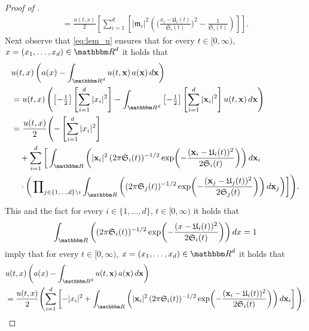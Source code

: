 \begin{proof}[Proof of ]
\begin{equation}
\begin{split}
			= \frac{u(t,x)}{2} \left[ \sum_{i=1}^d \left[ |\mathfrak{m}_i|^2 \left( \bigg(\frac{x_i - \mathfrak{U}_i(t)}{\mathfrak{S}_i(t)}\bigg)^{\!2} - \frac{1}{\mathfrak{S}_i(t)} \right)\right]\right].
		\end{split}
	\end{equation}
	Next observe that \eqref{eq:lem_u} ensures that for every
	$t \in [0,\infty)$,
	$x = (x_1, \dots,x_d)\in \R^d$
	it holds that
	\begin{equation}
		\begin{split}
			&u(t,x)\left( a(x) - \int_{\R^d} u(t,{\textbf x})\, a({\textbf x}) \, d{\textbf x} \right) \\
			&= u(t,x) \left(\left[ - \tfrac{1}{2} \right] \left[\sum_{i=1}^d |x_i|^2 \right] - \int_{\R^d} \left[ - \tfrac{1}{2} \right] \left[ \sum_{i=1}^d |{\textbf x}_i|^2 \right] u(t,{\textbf x}) \, d {\textbf x} \right)\\
			&= \frac{u(t,x)}{2} \Biggl( - \left[\sum_{i=1}^d |x_i|^2 \right] \\
			&\quad + \sum_{i=1}^d \bigg[ \int_\R \left( |{\textbf x}_i|^2 \, (2\pi    \mathfrak{S}_i(t))^{-1/2}    \exp \! \left( - \frac{({ \textbf x}_i -\mathfrak{U}_i(t) )^2}{2\mathfrak{S}_i(t)}\right) \right) d{\textbf x}_i  \\
			&\quad \cdot \bigg(\prod\nolimits_{ j \in \{ 1, \dots,d \} \backslash i} \int_\R \left((2\pi    \mathfrak{S}_j(t))^{-1/2}    \exp \! \left( - \frac{({\textbf x}_j -\mathfrak{U}_j(t) )^2}{2\mathfrak{S}_j(t)}\right) \right) d{\textbf x_j} \bigg) \bigg] \Biggr).
			\end{split}
		\end{equation}
	This and the fact for every
	$i \in \{1, \dots, d\}$,
	$t \in [0,\infty)$
	it holds that
	\begin{equation}
		\int_\R \left( (2\pi    \mathfrak{S}_i(t))^{-1/2}    \exp \! \left( - \frac{( x -\mathfrak{U}_i(t) )^2}{2\mathfrak{S}_i(t)}\right) \right) d x  = 1
	\end{equation}
	imply that for every
	$t \in [0,\infty)$,
	$x = (x_1, \dots,x_d)\in \R^d$
	it holds that 
	\begin{equation}\label{lem:derivatives4}
		\begin{split}
			&u(t,x)\left( a(x) - \int_{\R^d} u(t,{\textbf x})\, a({\textbf x}) \, d{\textbf x} \right) \\
			&= \frac{u(t,x)}{2} \Biggl(\sum_{i=1}^d \left[- |x_i|^2 + \int_\R \left( |{\textbf x}_i|^2 \, (2\pi    \mathfrak{S}_i(t))^{-1/2}    \exp \! \left( - \frac{({ \textbf x}_i -\mathfrak{U}_i(t) )^2}{2\mathfrak{S}_i(t)}\right) \right) d{\textbf x}_i \right]\Bigg).

\end{split}
\end{equation}
\end{proof}
